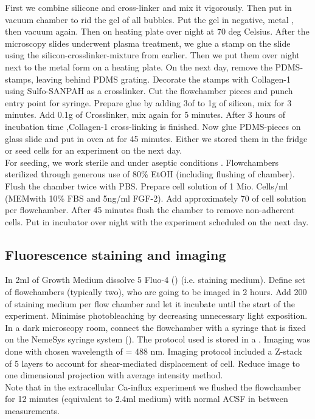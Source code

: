 First we combine silicone  and cross-linker  and mix it vigorously. Then put in vacuum chamber to rid the gel of all bubbles. Put the gel in negative, metal , then vacuum again. Then on heating plate over night at 70 deg Celsius. After the microscopy slides underwent plasma treatment, we glue a stamp on the slide using the silicon-crosslinker-mixture from earlier. Then we put them over night next to the metal form on a heating plate. On the next day, remove the PDMS-stamps, leaving behind PDMS grating. Decorate the stamps with Collagen-1  using Sulfo-SANPAH as a crosslinker. Cut the flowchamber pieces and punch entry point for syringe. Prepare glue by adding 3\mul of  to 1g of silicon, mix for 3 minutes. Add 0.1g of Crosslinker, mix again for 5 minutes. After 3 hours of incubation time ,Collagen-1 cross-linking is finished. Now glue PDMS-pieces on glass slide and put in oven at  for 45 minutes. Either we stored them in the fridge or seed cells for an experiment on the next day.\\
For seeding, we work sterile and under aseptic conditions . Flowchambers sterilized through generous use of 80\% EtOH (including flushing of chamber). Flush the chamber twice with PBS. Prepare cell solution of 1 Mio. Cells/ml (MEM\textalpha{ }with 10\% FBS and 5ng/ml FGF-2). Add approximately 70 \mul of cell solution per flowchamber. After 45 minutes flush the chamber to remove non-adherent cells. Put in incubator over night with the experiment scheduled on the next day.

\subsection{Fluorescence staining and imaging}
In 2ml of Growth Medium dissolve 5\mul{} Fluo-4 () (i.e. staining medium). Define set of flowchambers (typically two), who are going to be imaged in 2 hours. Add 200\mul{} of staining medium per flow chamber and let it incubate until the start of the experiment. Minimise photobleaching by decreasing unnecessary light exposition. In a dark microscopy room, connect the flowchamber with a syringe that is fixed on the NemeSys syringe system (). The protocol used is stored in a \myworries{}. Imaging was done with chosen wavelength of \textlambda = 488 nm.  Imaging protocol included a Z-stack of 5 layers to account for shear-mediated displacement of cell. Reduce image to one dimensional projection with average intensity method.  \\
Note that in the extracellular Ca-influx experiment we flushed the flowchamber for 12 minutes (equivalent to 2.4ml medium) with normal ACSF in between measurements.


